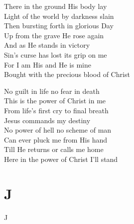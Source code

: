 \documentclass{beamer}
\begin{document}
{\begin{frame}{}
\end{frame}

\hypertarget{In Christ alone[]3}{}
\begin{frame}{}
\fontsize{ 18 }{ 23 }\selectfont

There in the ground His body lay\\ 
Light of the world by darkness slain\\ 
Then bursting forth in glorious Day\\ 
Up from the grave He rose again\\ 
And as He stands in victory\\ 
Sin's curse has lost its grip on me\\ 
For I am His and He is mine\\ 
Bought with the precious blood of Christ 

\end{frame}

\hypertarget{In Christ alone[]4}{}
\begin{frame}{}
\fontsize{ 18 }{ 23 }\selectfont

No guilt in life no fear in death\\ 
This is the power of Christ in me\\ 
From life's first cry to final breath\\ 
Jesus commands my destiny\\ 
No power of hell no scheme of man\\ 
Can ever pluck me from His hand\\ 
Till He returns or calls me home\\ 
Here in the power of Christ I'll stand 

\end{frame}

}
\section{J}

\begin{frame}[t]{J}
\begin{columns}[t]

    


    


\end{columns}

\end{frame}
\end{document}
